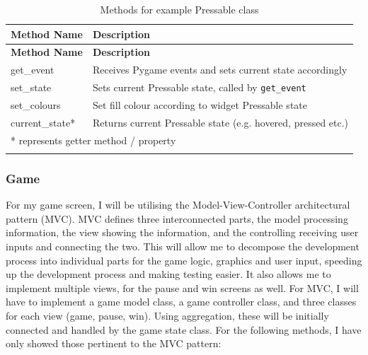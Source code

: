 \documentclass[../main/main.tex]{subfiles}
\begin{document}
\begin{longtable}[c]{l|l}
    \toprule
    \textbf{Method Name} & \textbf{Description}\\
    \midrule
    \endfirsthead
    \textbf{Method Name} & \textbf{Description}\\
    \midrule
    \endhead

    get\_event & Receives Pygame events and sets current state accordingly\\
    set\_state & Sets current Pressable state, called by \lstinline[language=Python]{get_event}\\
    set\_colours & Set fill colour according to widget Pressable state\\
    current\_state* & Returns current Pressable state (e.g. hovered, pressed etc.)\\

    \midrule

    \multicolumn{2}{l}{* represents getter method / property}\\

    \bottomrule
    
\caption{Methods for example Pressable class}
\label{tab:pressable-methods}
\end{longtable}

\subsubsection*{Game}
For my game screen, I will be utilising the Model-View-Controller architectural pattern (MVC). MVC defines three interconnected parts, the model processing information, the view showing the information, and the controlling receiving user inputs and connecting the two. This will allow me to decompose the development process into individual parts for the game logic, graphics and user input, speeding up the development process and making testing easier. It also allows me to implement multiple views, for the pause and win screens as well. For MVC, I will have to implement a game model class, a game controller class, and three classes for each view (game, pause, win). Using aggregation, these will be initially connected and handled by the game state class. For the following methods, I have only showed those pertinent to the MVC pattern: 
\end{document}
